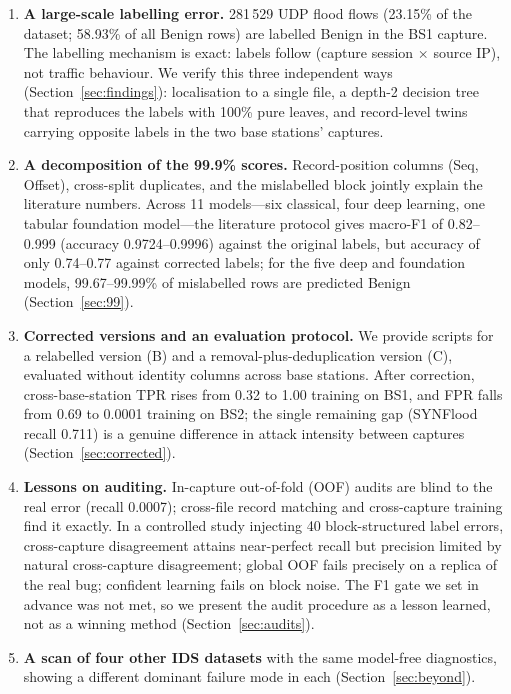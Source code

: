 \documentclass[preprint,12pt]{elsarticle}
\begin{document}
\begin{enumerate}
\item \textbf{A large-scale labelling error.} 281\,529 UDP flood flows (23.15\%
of the dataset; 58.93\% of all Benign rows) are labelled Benign in the BS1
capture. The labelling mechanism is exact: labels follow (capture session
$\times$ source IP), not traffic behaviour. We verify this three independent
ways (Section~\ref{sec:findings}): localisation to a single file, a depth-2
decision tree that reproduces the labels with 100\% pure leaves, and
record-level twins carrying opposite labels in the two base stations' captures.
\item \textbf{A decomposition of the 99.9\% scores.} Record-position columns
(Seq, Offset), cross-split duplicates, and the mislabelled block jointly explain
the literature numbers. Across 11 models---six classical, four deep learning,
one tabular foundation model---the literature protocol gives macro-F1 of
0.82--0.999 (accuracy 0.9724--0.9996) against the original labels, but accuracy
of only 0.74--0.77 against
corrected labels; for the five deep and foundation models, 99.67--99.99\% of
mislabelled rows are predicted Benign
(Section~\ref{sec:99}).
\item \textbf{Corrected versions and an evaluation protocol.} We provide scripts
for a relabelled version (B) and a removal-plus-deduplication version (C),
evaluated without identity columns across base stations. After correction,
cross-base-station TPR rises from 0.32 to 1.00 training on BS1, and FPR falls
from 0.69 to 0.0001 training on BS2; the single remaining gap (SYNFlood recall 0.711) is a genuine
difference in attack intensity between captures (Section~\ref{sec:corrected}).
\item \textbf{Lessons on auditing.} In-capture out-of-fold (OOF) audits are
blind to the real error (recall 0.0007); cross-file record matching and
cross-capture training find it exactly. In a controlled study injecting 40
block-structured label errors, cross-capture disagreement attains near-perfect
recall but precision limited by natural cross-capture disagreement; global OOF
fails precisely on a replica of the real bug; confident learning fails on block
noise. The F1 gate we set in advance was not met, so we present the audit
procedure as a lesson learned, not as a winning method
(Section~\ref{sec:audits}).
\item \textbf{A scan of four other IDS datasets} with the same model-free
diagnostics, showing a different dominant failure mode in each
(Section~\ref{sec:beyond}).
\end{enumerate}
\end{document}
